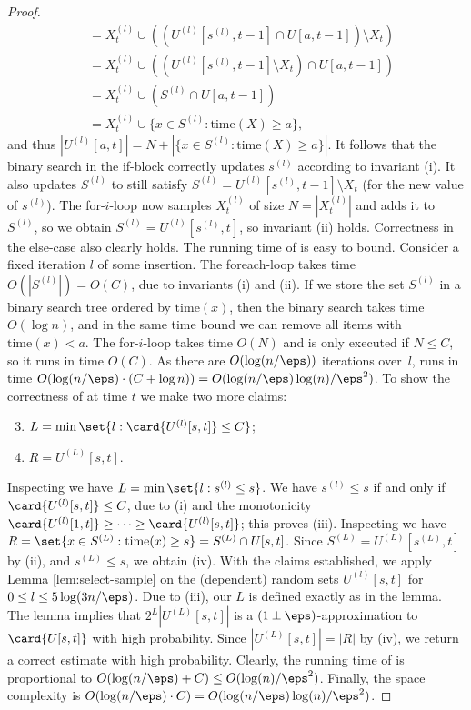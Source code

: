 \begin{proof}
\begin{align*}
        &= X_t^{(l)} \cup ((U^{(l)}[s^{(l)}, t-1] \cap U[a, t-1]) \setminus X_t) \\
        &= X_t^{(l)} \cup ((U^{(l)}[s^{(l)}, t-1] \setminus X_t) \cap U[a, t-1]) \\
        &= X_t^{(l)} \cup (S^{(l)} \cap U[a,t-1])  \\
        &= X_t^{(l)} \cup \{x \in S^{(l)} \colon \mathrm{time}(X) \ge a \},
    \end{align*}
    and thus $|U^{(l)}[a,t]| = N + |\{x \in S^{(l)} \colon \mathrm{time}(X) \ge a \}|$. It follows that the binary search in the if-block correctly updates $s^{(l)}$ according to invariant (i). It also updates $S^{(l)}$ to still satisfy $S^{(l)} = U^{(l)}[s^{(l)}, t-1] \setminus X_t$ (for the new value of $s^{(l)}$). The for-$i$-loop now samples $X_t^{(l)}$ of size $N = |X_t^{(l)}|$ and adds it to $S^{(l)}$, so we obtain $S^{(l)} = U^{(l)}[s^{(l)}, t]$, so invariant (ii) holds. Correctness in the else-case also clearly holds.
%
    The running time of \ins is easy to bound.
    Consider a fixed iteration $l$ of some insertion. The foreach-loop takes time $O(|S^{(l)}|) = O(C)$, due to invariants (i) and (ii). 
    If we store the set $S^{(l)}$ in a binary search tree ordered by $\mathrm{time}(x)$, then the binary search takes time $O(\log n)$, and in the same time bound we can remove all items with $\mathrm{time}(x) < a$.
    The for-$i$-loop takes time $O(N)$ and is only executed if $N \le C$, so it runs in time $O(C)$.
    As there are $O(\log(n/\eps))$ iterations over~$l$, \ins runs in time $O(\log(n/\eps) \cdot (C + \log n)) = O(\log(n/\eps) \log(n)/\eps^2)$.
%
    \smallskip
    To show the correctness of  at time $t$ we make two more claims:
    \begin{enumerate}[label={(\roman*)}]
        \setcounter{enumi}{2}
        \item $L = \min \set{ l : \card{U^{(l)}[s,t]} \leq C }$;
        \item $R = U^{(L)}[s,t]$.
    \end{enumerate}
    Inspecting  we have $L = \min \set{l : s^{(l)} \leq s}$. We have $s^{(l)} \leq s$ if and only if $\card{U^{(l)}[s,t]} \leq C$, due to (i) and the monotonicity $\card{U^{(l)}[1,t]} \geq \cdots \geq \card{U^{(l)}[s,t]}$; this proves (iii). Inspecting  we have $R = \set{x \in S^{(L)} : \mathrm{time}(x) \geq s } = S^{(L)} \cap U[s,t]$. Since $S^{(L)} = U^{(L)}[s^{(L)},t]$ by (ii), and $s^{(L)} \leq s$, we obtain (iv).
%
    With the claims established, we apply Lemma \ref{lem:select-sample} on the (dependent) random sets $U^{(l)}[s,t]$ for $0 \le l \le 5 \log(3n/\eps)$. Due to (iii), our $L$ is defined exactly as in the lemma. The lemma implies that $2^L |U^{(L)}[s,t]|$ is a $(1 \pm \eps)$-approximation to $\card{U[s,t]}$ with high probability. Since $|U^{(L)}[s,t]| = |R|$ by (iv), we return a correct estimate with high probability.
%
    Clearly, the running time of \est is proportional to $O(\log(n/\eps) + C) \leq O(\log(n)/\eps^2)$.
%
    Finally, the space complexity is $O(\log(n/\eps) \cdot C) = O(\log(n/\eps) \log(n)/\eps^2 )$.
\end{proof}
